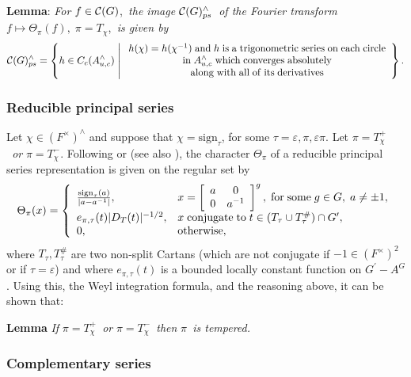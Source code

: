 \documentclass[11pt, a4paper]{article}
\begin{document}
{\bf Lemma}: {\em For }$f\in {\cal C}(G)$,{\em \ the image }${\cal C}%
(G)_{ps}^{\wedge }${\em \ of the Fourier transform }$f\longmapsto \Theta
_\pi (f),\;\pi =T_\chi $,{\em \ is given by}
\[
{\cal C}(G)_{ps}^{\wedge }=\left\{h\in C_c(A_{u,c}^{\wedge })\;\middle|\; 
\begin{array}{c}
h(\chi )=h(\chi ^{-1})\;{\rm and}\;h\;{\rm is\;a\;trigonometric\;series\;on\;each\;circle} \\ 
{\rm in}\;A_{u,c}^{\wedge }\;{\rm which\;converges\;absolutely} \\ 
{\rm along\;with\;all\;of\;its\;derivatives}
\end{array}
\right\}.
\]

\subsubsection{Reducible principal series}

Let $\chi \in (F^{\times })^{\wedge }$ and suppose that $\chi =\mathrm{sign}_\tau $,
for some $\tau =\varepsilon ,\pi ,\varepsilon \pi $. Let $\pi =T_\chi ^{+}$%
{\em \ or }$\pi =T_\chi ^{-}$. Following \cite{SS1,SS2} or \cite{Fr} (see also \cite{A}), the
character $\Theta _\pi $ of a reducible principal series representation is
given on the regular set by
\[
\Theta _\pi (x)=\left\{ 
\begin{array}{ll}
\frac{\mathrm{sign}_\tau (a)}{|a-a^{-1}|}, & x=\left[ 
\begin{array}{cc}
a & 0 \\ 
0 & a^{-1}
\end{array}
\right] ^g,\;{\rm for\;some}\;g\in G,\;a\neq \pm 1, \\ 
e_{\pi ,\tau }(t)|D_T(t)|^{-1/2}, & x\;{\rm conjugate\;to}\;t\in (T_\tau
\cup T_\tau ^{\#})\cap G^{\prime }, \\ 
0, & {\rm otherwise},
\end{array}
\right.
\]
where $T_\tau ,T_\tau ^{\#}$ are two non-split Cartans (which are not
conjugate if $-1\in (F^{\times })^2$ or if $\tau =\varepsilon $) and where $%
e_{\pi ,\tau }(t)$ is a bounded locally constant function on $G^{\prime
}-A^G$. Using this, the Weyl integration formula, and the reasoning above,
it can be shown that:

{\bf Lemma} {\em If }$\pi =T_\chi ^{+}${\em \ or }$\pi =T_\chi ^{-}${\em \
then }$\pi ${\em \ is tempered.}

\subsubsection{Complementary series}
\end{document}
